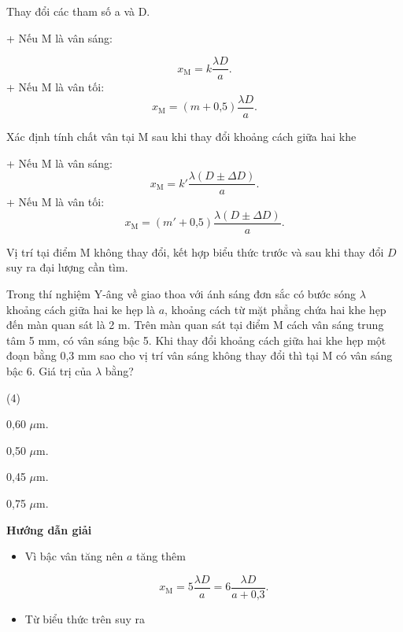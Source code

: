 \begin{dang}{Thay đổi các tham số a và D.}
{\begin{description}
	+ Nếu M là vân sáng:
	
	\begin{equation}
		x_{\text{M}}=k\dfrac{\lambda D}{a}.
	\end{equation}
	+ Nếu M là vân tối:
	\begin{equation}
		x_{\text{M}}=(m+\text{0,5})\dfrac{\lambda D}{a}.
	\end{equation}
	\item [Bước 2] Xác định tính chất vân tại M sau khi thay đổi khoảng cách giữa hai khe
	
	+ Nếu M là vân sáng:
	\begin{equation}
		x_{\text{M}}=k'\dfrac{\lambda (D \pm \Delta D)}{a}.
	\end{equation}
	+ Nếu M là vân tối:
	\begin{equation}
		x_{\text{M}}=(m'+\text{0,5})\dfrac{\lambda (D \pm \Delta D)}{a}.
	\end{equation}
	\item [Bước 3] Vị trí tại điểm M không thay đổi, kết hợp biểu thức trước và sau khi thay đổi $D$ suy ra đại lượng cần tìm.
\end{description}
}



{
Trong  thí nghiệm Y-âng về giao thoa với ánh sáng đơn sắc có bước sóng $\lambda$  khoảng cách giữa hai ke hẹp là $a$, khoảng cách từ mặt phẳng chứa hai khe hẹp đến màn quan sát là 2 m. Trên màn quan sát tại điểm M cách vân sáng trung tâm 5 mm, có vân sáng bậc 5. Khi thay đổi khoảng cách giữa hai khe hẹp một đoạn bằng 0,3 mm sao cho vị trí vân sáng không thay đổi thì tại M có vân sáng bậc 6. Giá trị của $\lambda$  bằng?
\begin{mcq}(4)
\item 0,60 $\mu$m.		
\item 0,50 $\mu$m.		
\item 0,45 $\mu$m.		
\item 0,75 $\mu$m.	
\end{mcq}}
{\begin{center}
	\textbf{Hướng dẫn giải}
\end{center}
\begin{itemize}
	\item Vì bậc vân tăng nên $a$ tăng thêm
	
	\begin{equation*}
		x_{\text{M}}=5 \dfrac{\lambda D}{a}= 6 \dfrac{\lambda D}{a+ \text{0,3}}.
	\end{equation*}
	\item Từ biểu thức trên suy ra 
	

\end{itemize}}
\end{dang}
